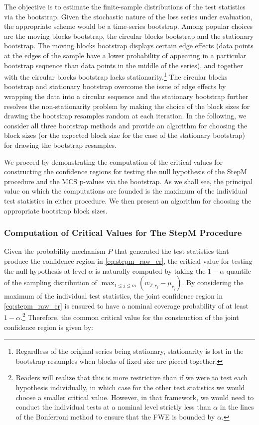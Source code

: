 \documentclass{article} %
\begin{document}
	The objective is to estimate the finite-sample distributions of the test statistics via the bootstrap. Given the stochastic nature of the loss series under evaluation, the appropriate scheme would be a time-series bootstrap. Among popular choices are the moving blocks bootstrap, the circular blocks bootstrap and the stationary bootstrap. The moving blocks bootstrap displays certain edge effects (data points at the edges of the sample have a lower probability of appearing in a particular bootstrap sequence than data points in the middle of the series), and together with the circular blocks bootstrap lacks stationarity.\footnote{Regardless of the original series being stationary, stationarity is lost in the bootstrap resamples when blocks of fixed size are pieced together.} The circular blocks bootstrap and stationary bootstrap overcome the issue of edge effects by wrapping the data into a circular sequence and the stationary bootstrap further resolves the non-stationarity problem by making the choice of the block sizes for drawing the bootstrap resamples random at each iteration. In the following, we consider all three bootstrap methods and provide an algorithm for choosing the block sizes (or the expected block size for the case of the stationary bootstrap) for drawing the bootstrap resamples.
	
	We proceed by demonstrating the computation of the critical values for constructing the confidence regions for testing the null hypothesis of the StepM procedure and the MCS p-values via the bootstrap. As we shall see, the principal value on which the computations are founded is the maximum of the individual test statistics in either procedure. We then present an algorithm for choosing the appropriate bootstrap block sizes.
	
	\subsubsection{Computation of Critical Values for The StepM Procedure}
	Given the probability mechanism $P$ that generated the test statistics that produce the confidence region in \eqref{eq:stepm_raw_cr}, the critical value for testing the null hypothesis at level $\alpha$ is naturally computed by taking the $1 - \alpha$ quantile of the sampling distribution of $\max_{1 \leq j \leq m}(w_{T,r_j} - \mu_{r_j})$. By considering the maximum of the individual test statistics, the joint confidence region in \eqref{eq:stepm_raw_cr} is ensured to have a nominal coverage probability of at least $1 - \alpha$.\footnote{Readers will realize that this is more restrictive than if we were to test each hypothesis individually, in which case for the other test statistics we would choose a smaller critical value. However, in that framework, we would need to conduct the individual tests at a nominal level strictly less than $\alpha$ in the lines of the Bonferroni method to ensure that the FWE is bounded by $\alpha$.} Therefore, the common critical value for the construction of the joint confidence region is given by:
	
\end{document}
